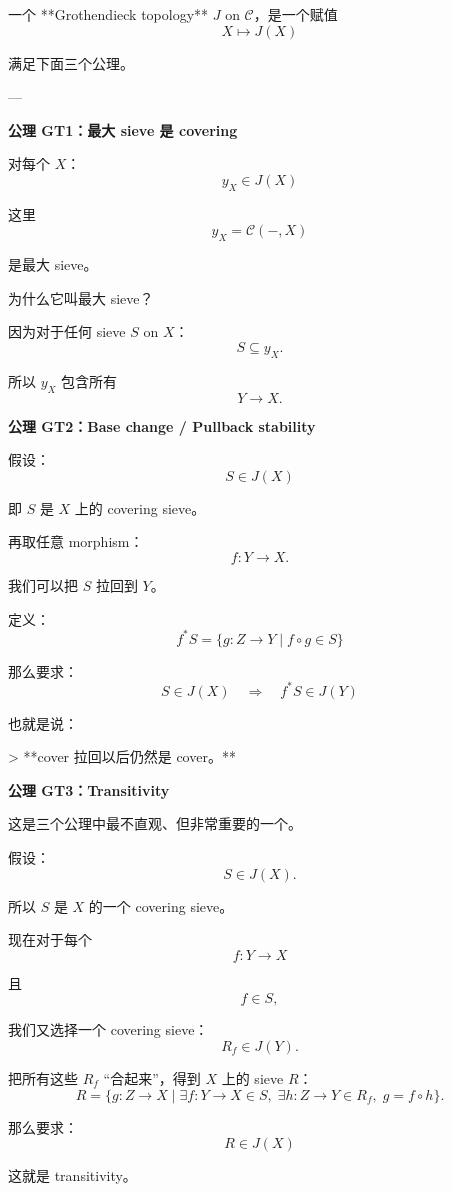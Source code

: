 \documentclass{beamer}
\begin{document}
\begin{frame}[fragile]
\begin{markdown}
一个 **Grothendieck topology** $J$ on $\mathcal C$，是一个赋值
$$
X\mapsto J(X)
$$

满足下面三个公理。

---

\textbf{公理 GT1：最大 sieve 是 covering}

对每个 $X$：
$$
\boxed{
y_X\in J(X)
}
$$

这里
$$
y_X=\mathcal C(-,X)
$$

是最大 sieve。

为什么它叫最大 sieve？

因为对于任何 sieve $S$ on $X$：
$$
S\subseteq y_X.
$$

所以 $y_X$ 包含所有
$$
Y\to X.
$$
\end{markdown}
\end{frame}

\begin{frame}[fragile]
\begin{markdown}
\textbf{公理 GT2：Base change / Pullback stability}

假设：
$$
S\in J(X)
$$

即 $S$ 是 $X$ 上的 covering sieve。

再取任意 morphism：
$$
f:Y\to X.
$$

我们可以把 $S$ 拉回到 $Y$。

定义：
$$
\boxed{f^*S = \{g:Z\to Y\mid f\circ g\in S\}}
$$

那么要求：
$$
\boxed{S\in J(X)\quad\Longrightarrow\quad f^*S\in J(Y)}
$$

也就是说：

> **cover 拉回以后仍然是 cover。**
\end{markdown}
\end{frame}

\begin{frame}[fragile]
\begin{markdown}
\textbf{公理 GT3：Transitivity}

这是三个公理中最不直观、但非常重要的一个。

假设：
$$
S\in J(X).
$$

所以 $S$ 是 $X$ 的一个 covering sieve。

现在对于每个
$$
f:Y\to X
$$

且
$$
f\in S,
$$

我们又选择一个 covering sieve：
$$
R_f\in J(Y).
$$

把所有这些 $R_f$ “合起来”，得到 $X$ 上的 sieve $R$：
$$
R=
\{g:Z\to X
\mid
\exists f:Y\to X\in S,\;
\exists h:Z\to Y\in R_f,\;
g=f\circ h
\}.
$$

那么要求：
$$
\boxed{
R\in J(X)
}
$$

这就是 transitivity。
\end{markdown}
\end{frame}
\end{document}
